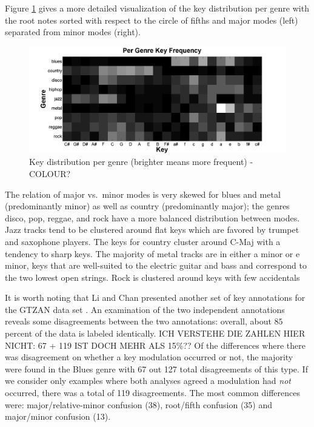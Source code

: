 \documentclass{article}
\begin{document}
Figure \ref{fig:KeyDistributionPerGenre} gives a more detailed visualization of the key distribution per genre with the root notes sorted with respect to the circle of fifths and major modes (left) separated from minor modes (right). 
\begin{figure}
    \includegraphics[scale=.2]{graph/key_distribution2}
	\caption{Key distribution per genre (brighter means more frequent) - COLOUR?}
	\label{fig:KeyDistributionPerGenre}
\end{figure}
The relation of major vs.\ minor modes is very skewed for blues and metal (predominantly minor) as well as country (predominantly major); the genres disco, pop, reggae, and rock have a more balanced distribution between modes. Jazz tracks tend to be clustered around flat keys which are favored by trumpet and saxophone players. The keys for country cluster around C-Maj with a tendency to sharp keys. The majority of metal tracks are in either a minor or e minor, keys that are well-suited to the electric guitar and bass and correspond to the two lowest open strings. Rock is clustered around keys with few accidentals


It is worth noting that Li and Chan presented another set of key annotations for the GTZAN data set \cite{li_genre_2011}. An examination of the two independent annotations reveals some disagreements between the two annotations: overall, about $85$ percent of the data is labeled identically. 
ICH VERSTEHE DIE ZAHLEN HIER NICHT: 67 + 119 IST DOCH MEHR ALS 15\%??
Of the differences where there was disagreement on whether a key modulation occurred or not, the majority were found in the Blues genre with 67 out 127 total disagreements of this type. If we consider only examples where both analyses agreed a modulation had \textit{not} occurred, there was a total of 119 disagreements. The most common differences were: major/relative-minor confusion (38), root/fifth confusion (35) and major/minor confusion (13).
\end{document}
